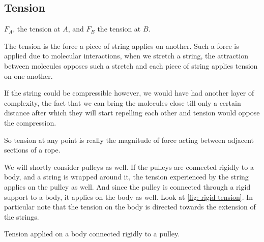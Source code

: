 \subsection{Tension}

\begin{marginfigure}
    \caption{\(F_A\), the tension at \(A\), and \(F_B\) the tension at \(B\).}
\end{marginfigure}

The tension is the force a piece of string applies on another. Such a force 
is applied due to molecular interactions, when we stretch a string, the attraction 
between molecules opposes such a stretch and each piece of string applies tension on one another.

If the string could be compressible however, we would have had another layer of complexity,
the fact that we can bring the molecules close till only a certain distance after which 
they will start repelling each other and tension would oppose the compression.

So tension at any point is really the magnitude of force acting between adjacent sections of a rope.

We will shortly consider pulleys as well. If the pulleys are connected rigidly to 
a body, and a string is wrapped around it, the tension experienced by the string applies on the 
pulley as well. And since the pulley is connected through a rigid support to a body, 
it applies on the body as well. Look at \cref{fig: rigid tension}. In particular note that 
the tension on the body is directed towards the extension of the strings.

\begin{marginfigure}
    \caption{Tension applied on a body connected rigidly to a pulley.}
    \label{fig: rigid tension}
\end{marginfigure}

